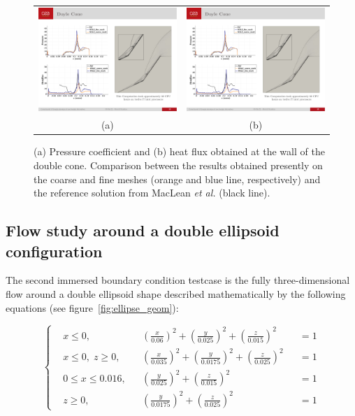\begin{figure}[ht!]
    \centering
    \begin{tabular}{cc}
        \includegraphics[width=0.47\linewidth]{chapter3_numerical_methods/pictures/double_cone_pressure.pdf} &
        \includegraphics[width=0.47\linewidth]{chapter3_numerical_methods/pictures/double_cone_heat_flux.pdf} \\
        (a) & (b)
    \end{tabular}
    \caption{(a) Pressure coefficient and (b) heat flux obtained at the wall of the double cone.
    Comparison between the results obtained presently on the coarse and fine meshes (orange and blue line, respectively) and the reference solution from MacLean \emph{et al.} \cite{MacLean2014} (black line).}
    \label{fig:double_cone_comp}
\end{figure}


\subsection{Flow study around a double ellipsoid configuration}\label{ssec:test_ellipsoid}

The second immersed boundary condition testcase is the fully three-dimensional flow around a double ellipsoid shape \cite{Aymer1991} described mathematically by the following equations (see figure~\ref{fig:ellipse_geom}):

\begin{equation}
    \left\lbrace
    \begin{aligned}
        &x \leq 0,            &&\left( \frac{x}{0.06} \right)^2 + \left(\frac{y}{0.025} \right)^2 + \left( \frac{z}{0.015} \right)^2 &&= 1 \\
        &x \leq 0,\; z\geq 0, &&\left( \frac{x}{0.035} \right)^2 + \left(\frac{y}{0.0175} \right)^2 + \left( \frac{z}{0.025} \right)^2 &&= 1 \\
        &0 \leq x \leq 0.016, &&\left( \frac{y}{0.025} \right)^2 + \left( \frac{z}{0.015} \right)^2 &&= 1 \\
        &z \geq 0,            &&\left(\frac{y}{0.0175} \right)^2 + \left( \frac{z}{0.025} \right)^2 &&= 1
    \end{aligned}
    \right.
    \label{eq:double_ellipsoid_eqns}
\end{equation}

